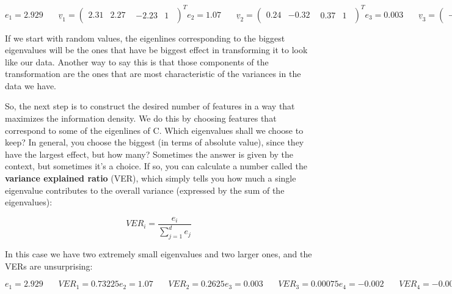 \documentclass[oneside,english]{amsbook}
\numberwithin{section}{chapter}
\theoremstyle{plain}
\theoremstyle{definition}
\begin{document}
\[{e_{1} = 2.929\ \ \ \ \ \ \ \ {\underline{v}}_{1} = \begin{pmatrix}
		2.31 & 2.27 & \begin{matrix}
			- 2.23 & 1
		\end{matrix}
	\end{pmatrix}^{T}
}{e_{2} = 1.07\ \ \ \ \ \ \ \ {\underline{v}}_{2} = \begin{pmatrix}
		0.24 & - 0.32 & \begin{matrix}
			0.37 & 1
		\end{matrix}
	\end{pmatrix}^{T}
}{e_{3} = 0.003\ \ \ \ \ \ \ \ {\underline{v}}_{3} = \begin{pmatrix}
		- 1.85 & - 0.06 & \begin{matrix}
			- 1.52 & 1
		\end{matrix}
	\end{pmatrix}^{T}
}{e_{4} = - 0.002\ \ \ \ \ \ \ \ {\underline{v}}_{4} = \begin{pmatrix}
		- 2.35 & 5.19 & \begin{matrix}
			3.3 & 1
		\end{matrix}
	\end{pmatrix}^{T}\ }\]

If we start with random values, the eigenlines corresponding to the
biggest eigenvalues will be the ones that have be biggest effect in
transforming it to look like our data. Another way to say this is that
those components of the transformation are the ones that are most
characteristic of the variances in the data we have.

So, the next step is to construct the desired number of features in a
way that maximizes the information density. We do this by choosing
features that correspond to some of the eigenlines of C. Which
eigenvalues shall we choose to keep? In general, you choose the biggest
(in terms of absolute value), since they have the largest effect, but
how many? Sometimes the answer is given by the context, but sometimes
it's a choice. If so, you can calculate a number called the
\textbf{variance explained ratio} (VER), which simply tells you how much
a single eigenvalue contributes to the overall variance (expressed by
the sum of the eigenvalues):

\[VER_{i} = \frac{e_{i}}{\sum_{j = 1}^{d}e_{j}}\]

In this case we have two extremely small eigenvalues and two larger
ones, and the VERs are unsurprising:

\[{e_{1} = 2.929\ \ \ \ \ \ \ \ VER_{1} = 0.73225
}{e_{2} = 1.07\ \ \ \ \ \ \ \ VER_{2} = 0.2625
}{e_{3} = 0.003\ \ \ \ \ \ \ \ VER_{3} = 0.00075
}{e_{4} = - 0.002\ \ \ \ \ \ \ \ VER_{4} = - 0.0005}\]
\end{document}
